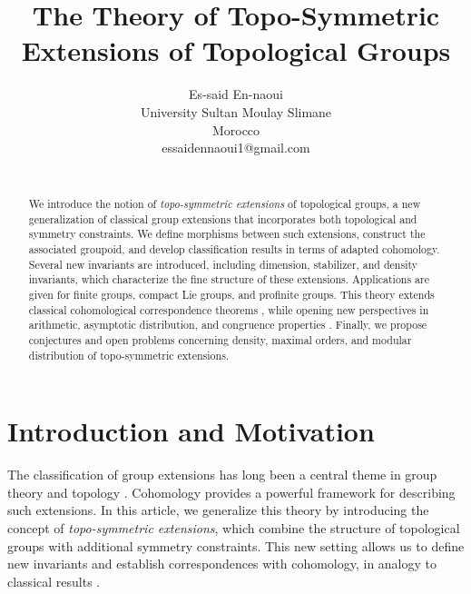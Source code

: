 \documentclass[11pt,a4paper]{article}
\theoremstyle{plain}
\theoremstyle{definition}
\theoremstyle{remark}
\begin{document}
	\title{The Theory of Topo-Symmetric Extensions of Topological Groups}
	
	\author{
		{ \sc Es-said En-naoui } \\ 
		University Sultan Moulay Slimane\\ Morocco\\
		essaidennaoui1@gmail.com\\
		\\
	}
	\maketitle
	\tableofcontents
	
	\maketitle
	
	\begin{abstract}
		We introduce the notion of \emph{topo-symmetric extensions} of topological groups, a new generalization of classical group extensions that incorporates both topological and symmetry constraints. We define morphisms between such extensions, construct the associated groupoid, and develop classification results in terms of adapted cohomology. Several new invariants are introduced, including dimension, stabilizer, and density invariants, which characterize the fine structure of these extensions. Applications are given for finite groups, compact Lie groups, and profinite groups. This theory extends classical cohomological correspondence theorems \cite{MacLane1963, EilenbergMacLane1947}, while opening new perspectives in arithmetic, asymptotic distribution, and congruence properties \cite{HardyWright2008, Serre1979}. Finally, we propose conjectures and open problems concerning density, maximal orders, and modular distribution of topo-symmetric extensions.
	\end{abstract}
	
	\tableofcontents
	
	\section{Introduction and Motivation}
	The classification of group extensions has long been a central theme in group theory and topology \cite{MacLane1963, EilenbergMacLane1947}. Cohomology provides a powerful framework for describing such extensions. 
	In this article, we generalize this theory by introducing the concept of \emph{topo-symmetric extensions}, which combine the structure of topological groups with additional symmetry constraints. 
	This new setting allows us to define new invariants and establish correspondences with cohomology, in analogy to classical results \cite{Brown1982, Serre1979}.
	
\end{document}
